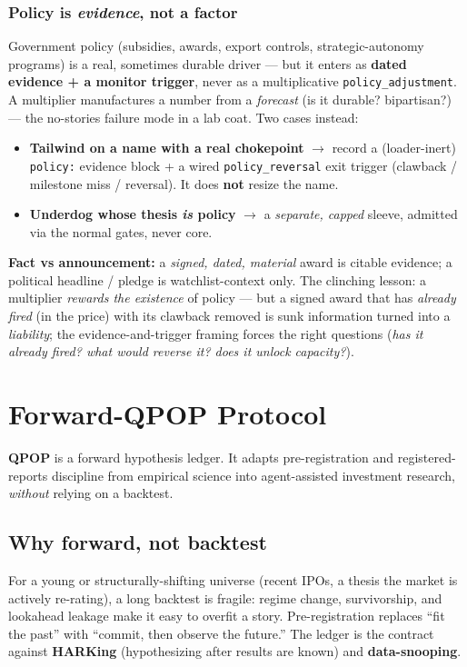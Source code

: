 \documentclass[11pt]{article}
\begin{document}
\subsubsection*{Policy is \emph{evidence}, not a factor}

Government policy (subsidies, awards, export controls, strategic-autonomy programs) is a real,
sometimes durable driver --- but it enters as \textbf{dated evidence + a monitor trigger}, never as
a multiplicative \texttt{policy\_adjustment}. A multiplier manufactures a number from a
\emph{forecast} (is it durable? bipartisan?) --- the no-stories failure mode in a lab coat. Two
cases instead:

\begin{itemize}
  \item \textbf{Tailwind on a name with a real chokepoint} $\to$ record a (loader-inert)
    \texttt{policy:} evidence block + a wired \texttt{policy\_reversal} exit trigger (clawback /
    milestone miss / reversal). It does \textbf{not} resize the name.
  \item \textbf{Underdog whose thesis \emph{is} policy} $\to$ a \emph{separate, capped} sleeve,
    admitted via the normal gates, never core.
\end{itemize}

\textbf{Fact vs announcement:} a \emph{signed, dated, material} award is citable evidence; a
political headline / pledge is watchlist-context only. The clinching lesson: a multiplier
\emph{rewards the existence} of policy --- but a signed award that has \emph{already fired} (in
the price) with its clawback removed is sunk information turned into a \emph{liability}; the
evidence-and-trigger framing forces the right questions (\emph{has it already fired? what would
reverse it? does it unlock capacity?}).

\section{Forward-QPOP Protocol}

\textbf{QPOP} is a forward hypothesis ledger. It adapts pre-registration and registered-reports
discipline from empirical science into agent-assisted investment research, \emph{without} relying
on a backtest.

\subsection*{Why forward, not backtest}

For a young or structurally-shifting universe (recent IPOs, a thesis the market is actively
re-rating), a long backtest is fragile: regime change, survivorship, and lookahead leakage make it
easy to overfit a story. Pre-registration replaces ``fit the past'' with ``commit, then observe the
future.'' The ledger is the contract against \textbf{HARKing} (hypothesizing after results are known)
and \textbf{data-snooping}.
\end{document}
